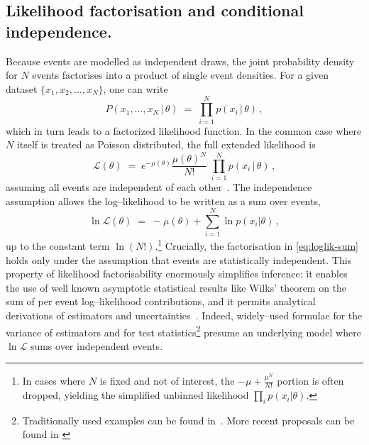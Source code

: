     \subsection{Likelihood factorisation and conditional independence.}
        Because events are modelled as independent draws, the joint probability density for $N$ events factorises into a product of single event densities.
        For a given dataset $\{x_1, x_2, \dots, x_N\}$, one can write 
        \[
             P(x_1,\ldots,x_N \,|\, \theta) \;=\; \prod_{i=1}^{N} p(x_i \,|\, \theta)\,,
        \] 
        which in turn leads to a factorized likelihood function.
        In the common case where $N$ itself is treated as Poisson distributed, the full extended likelihood is 
        \begin{equation}
            \mathcal{L}(\theta) \;=\; e^{-\mu(\theta)} \frac{\mu(\theta)^N}{N!}\;\prod_{i=1}^{N} p(x_i \,|\, \theta)\,,
            \label{eq:extended-likelihood}
        \end{equation}
        assuming all events are independent of each other~\cite{ParticleDataGroup:2018ovx, cowan_topics_2009, Back2001AFitting, Verkerke2008RooFit2.91, Singh2024MakingRooFit, Segura2024APhysics, scheirich_pleskot_2019}.
        The independence assumption allows the log--likelihood to be written as a sum over events,
        \begin{equation}
            \ln \mathcal{L}(\theta) \;=\; -\mu(\theta) + \sum_{i=1}^{N} \ln p(x_i|\theta)\,,
            \label{eq:loglik-sum}
        \end{equation}
        up to the constant term $\ln(N!)$.\footnote{In cases where $N$ is fixed and not of interest, the $-\mu + \frac{\mu^N}{N!}$ portion is often dropped, yielding the simplified unbinned likelihood $\prod_{i}p(x_i|\theta)$.}
        Crucially, the factorisation in \cref{eq:loglik-sum} holds only under the assumption that events are statistically independent.
        This property of likelihood factorisability enormously simplifies inference: it enables the use of well known asymptotic statistical results like Wilks’ theorem on the sum of per event log--likelihood contributions, and it permits analytical derivations of estimators and uncertainties~\cite{Cowan2011AsymptoticPhysics}.
        Indeed, widely--used formulae for the variance of estimators and for test statistics\footnote{Traditionally used examples can be found in~\cite{ParticleDataGroup:2022pth, ly_tutorial_2017}. More recent proposals can be found in \cite{Canonero:2023sua, Horoshko:2025yqj}} presume an underlying model where $\ln\mathcal{L}$ sums over independent events.
        

